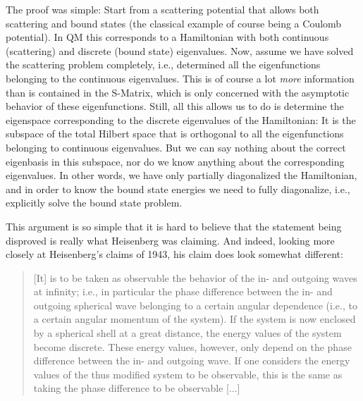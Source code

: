 \documentclass[12pt]{article}
\begin{document}
The proof was simple: Start from a scattering potential that allows both scattering and bound states (the classical example of course being a Coulomb potential). In QM this corresponds to a Hamiltonian with both continuous (scattering) and discrete (bound state) eigenvalues. Now, assume we have solved the scattering problem completely, i.e., determined all the eigenfunctions belonging to the continuous eigenvalues. This is of course a lot \emph{more} information than is contained in the S-Matrix, which is only concerned with the asymptotic behavior of these eigenfunctions. Still, all  this allows us to do is determine the eigenspace corresponding to the discrete eigenvalues of the Hamiltonian: It is the subspace of the total Hilbert space that is orthogonal to all the eigenfunctions belonging to continuous eigenvalues. But we can say nothing about the correct eigenbasis in this subspace, nor do we know anything about the corresponding eigenvalues. In other words, we have only partially diagonalized the Hamiltonian, and in order to know the bound state energies we need to fully diagonalize, i.e., explicitly solve the bound state problem. 

This argument is so simple that it is hard to believe that the statement being disproved is really what Heisenberg was claiming. And indeed, looking more closely at Heisenberg's claims of 1943, his claim does look somewhat different:

\begin{quote}
[It] is to be taken as observable the behavior of the in- and outgoing waves at infinity; i.e., in particular the phase difference between the in- and outgoing spherical wave belonging to a certain angular dependence (i.e., to a certain angular momentum of the system). If the system is now enclosed by a spherical shell at a great distance, the energy values of the system become discrete. These energy values, however, only depend on the phase difference between the in- and outgoing wave. If one considers the energy values of the thus modified system to be observable, this is the same as taking the phase difference to be observable [...]
\end{quote}
\end{document}
